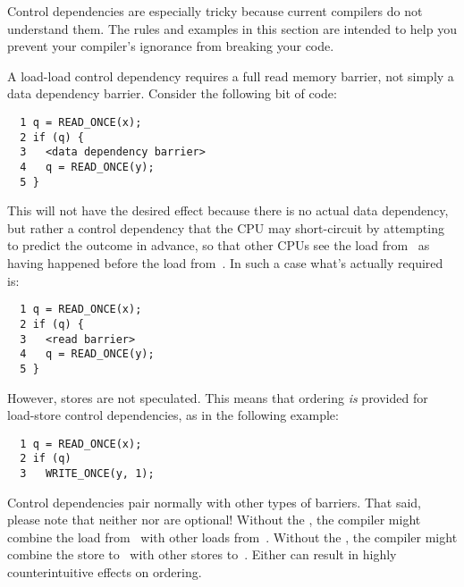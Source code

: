 Control dependencies are especially tricky because current compilers
do not understand them.
The rules and examples in this section are intended to help you
prevent your compiler's ignorance from breaking your code.

A load-load control dependency requires a full read memory barrier,
not simply a data dependency barrier.
Consider the following bit of code:

\vspace{5pt}
\begin{minipage}[t]{\columnwidth}
\scriptsize
\begin{verbatim}
  1 q = READ_ONCE(x);
  2 if (q) {
  3   <data dependency barrier>
  4   q = READ_ONCE(y);
  5 }
\end{verbatim}
\end{minipage}
\vspace{5pt}

This will not have the desired effect because there is no actual data
dependency, but rather a control dependency that the CPU may short-circuit
by attempting to predict the outcome in advance, so that other CPUs see
the load from~ as having happened before the load from~.
In such a case what's actually required is:

\vspace{5pt}
\begin{minipage}[t]{\columnwidth}
\scriptsize
\begin{verbatim}
  1 q = READ_ONCE(x);
  2 if (q) {
  3   <read barrier>
  4   q = READ_ONCE(y);
  5 }
\end{verbatim}
\end{minipage}
\vspace{5pt}

However, stores are not speculated.
This means that ordering \emph{is} provided for load-store control
dependencies, as in the following example:

\vspace{5pt}
\begin{minipage}[t]{\columnwidth}
\scriptsize
\begin{verbatim}
  1 q = READ_ONCE(x);
  2 if (q)
  3   WRITE_ONCE(y, 1);
\end{verbatim}
\end{minipage}
\vspace{5pt}

Control dependencies pair normally with other types of barriers.
That said, please note that neither  nor 
are optional!
Without the , the compiler might combine the load
from~ with other loads from~.
Without the , the compiler might combine the store
to~ with other stores to~.
Either can result in highly counterintuitive effects on ordering.

